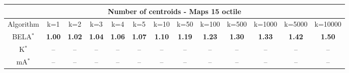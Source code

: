 \begin{tabular}{c|cccccccccccc}\toprule
\multicolumn{13}{c}{Number of centroids - Maps 15 octile}\\ \midrule
Algorithm & k=1 & k=2 & k=3 & k=4 & k=5 & k=10 & k=50 & k=100 & k=500 & k=1000 & k=5000 & k=10000 \\ \midrule
BELA$^*$ & \textbf{1.00} & \textbf{1.02} & \textbf{1.04} & \textbf{1.06} & \textbf{1.07} & \textbf{1.10} & \textbf{1.19} & \textbf{1.23} & \textbf{1.30} & \textbf{1.33} & \textbf{1.42} & \textbf{1.50} \\
K$^*$ & -- & -- & -- & -- & -- & -- & -- & -- & -- & -- & -- & -- \\
mA$^*$ & -- & -- & -- & -- & -- & -- & -- & -- & -- & -- & -- & -- \\ \bottomrule 
\end{tabular}
